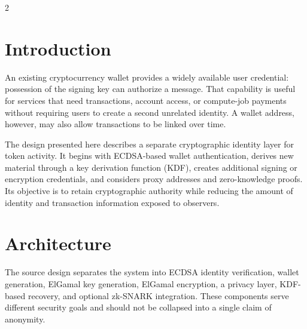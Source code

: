 \documentclass[10pt,letterpaper]{article}
\newcommand{\figstep}[1]{\tikz[baseline=(X.base)]\node[draw=black!55,rounded corners=2pt,fill=black!3,inner sep=5pt,text width=0.85\columnwidth,align=center,minimum height=0.34in] (X) {\footnotesize #1};}
\begin{document}
\begin{multicols}{2}

\section{Introduction}
An existing cryptocurrency wallet provides a widely available user credential: possession of the signing key can authorize a message. That capability is useful for services that need transactions, account access, or compute-job payments without requiring users to create a second unrelated identity. A wallet address, however, may also allow transactions to be linked over time.

The design presented here describes a separate cryptographic identity layer for token activity. It begins with ECDSA-based wallet authentication, derives new material through a key derivation function (KDF), creates additional signing or encryption credentials, and considers proxy addresses and zero-knowledge proofs. Its objective is to retain cryptographic authority while reducing the amount of identity and transaction information exposed to observers.

\section{Architecture}
The source design separates the system into ECDSA identity verification, wallet generation, ElGamal key generation, ElGamal encryption, a privacy layer, KDF-based recovery, and optional zk-SNARK integration. These components serve different security goals and should not be collapsed into a single claim of anonymity.

\begin{center}
\begin{minipage}{\columnwidth}
\centering
{}
\end{minipage}
\end{center}


\end{multicols}
\end{document}
